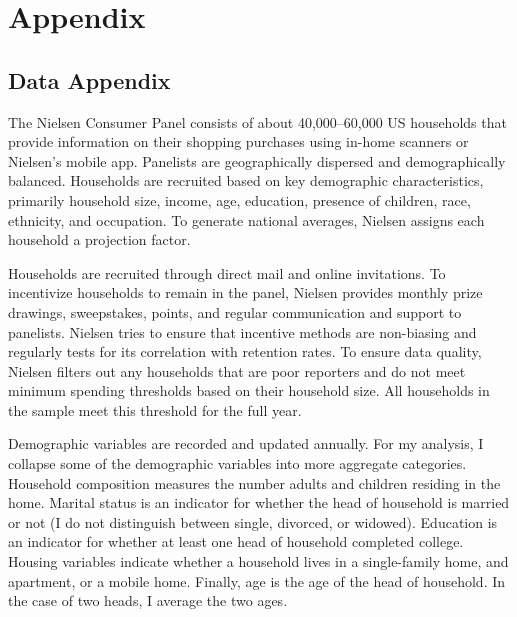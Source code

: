 \documentclass[AER]{AEA_mal}
\begin{document}
\section{Appendix}
\subsection{Data Appendix}
\label{sec:sampleConstruction}

The Nielsen Consumer Panel consists of about 40,000--60,000 US households that provide information on their shopping purchases using in-home scanners or Nielsen's mobile app. Panelists are geographically dispersed and demographically balanced. Households are recruited based on key demographic characteristics, primarily household size, income, age, education, presence of children, race, ethnicity, and occupation. To generate national averages, Nielsen assigns each household a projection factor.

Households are recruited through direct mail and online invitations. To incentivize households to remain in the panel, Nielsen provides monthly prize drawings, sweepstakes, points, and regular communication and support to panelists. Nielsen tries to ensure that incentive methods are non-biasing and regularly tests for its correlation with retention rates. To ensure data quality, Nielsen filters out any households that are poor reporters and do not meet minimum spending thresholds based on their household size. All households in the sample meet this threshold for the full year.

Demographic variables are recorded and updated annually. For my analysis, I collapse some of the demographic variables into more aggregate categories. Household composition measures the number adults and children residing in the home. Marital status is an indicator for whether the head of household is married or not (I do not distinguish between single, divorced, or widowed). Education is an indicator for whether at least one head of household completed college. Housing variables indicate whether a household lives in a single-family home, and apartment, or a mobile home. Finally, age is the age of the head of household. In the case of two heads, I average the two ages.
\end{document}
